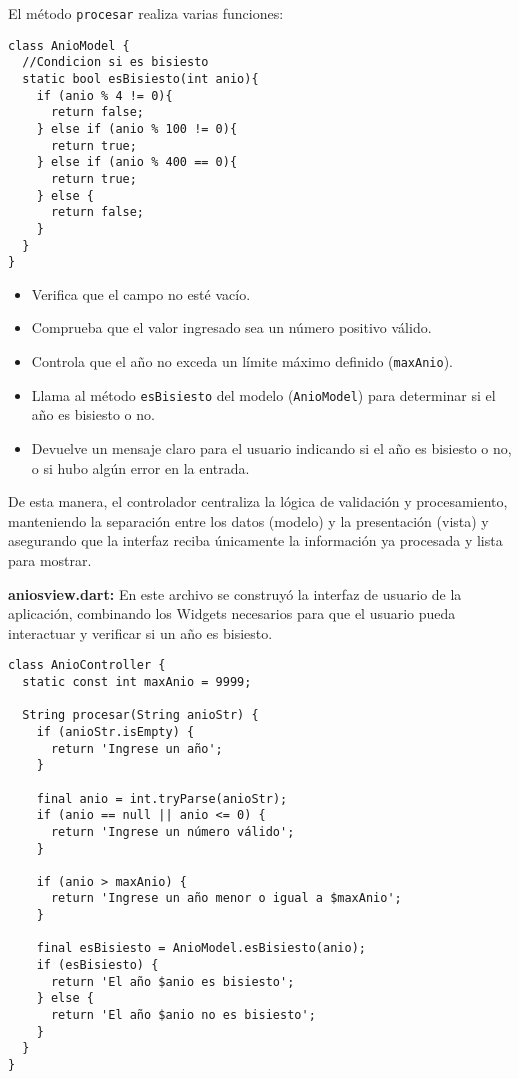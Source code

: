 El método \texttt{procesar} realiza varias funciones:  

\begin{center}
\begin{lstlisting}
class AnioModel {
  //Condicion si es bisiesto
  static bool esBisiesto(int anio){
    if (anio % 4 != 0){
      return false;
    } else if (anio % 100 != 0){
      return true;
    } else if (anio % 400 == 0){
      return true;
    } else {
      return false;
    }
  }
}
\end{lstlisting}
\end{center}

\begin{itemize}
    \item Verifica que el campo no esté vacío.
    \item Comprueba que el valor ingresado sea un número positivo válido.
    \item Controla que el año no exceda un límite máximo definido (\texttt{maxAnio}).
    \item Llama al método \texttt{esBisiesto} del modelo (\texttt{AnioModel}) para determinar si el año es bisiesto o no.
    \item Devuelve un mensaje claro para el usuario indicando si el año es bisiesto o no, o si hubo algún error en la entrada.
\end{itemize}

De esta manera, el controlador centraliza la lógica de validación y procesamiento, manteniendo la separación entre los datos (modelo) y la presentación (vista) y asegurando que la interfaz reciba únicamente la información ya procesada y lista para mostrar.

\textbf{aniosview.dart:}  
En este archivo se construyó la interfaz de usuario de la aplicación, combinando los Widgets necesarios para que el usuario pueda interactuar y verificar si un año es bisiesto.

\begin{center}
\begin{lstlisting}
class AnioController {
  static const int maxAnio = 9999;

  String procesar(String anioStr) {
    if (anioStr.isEmpty) {
      return 'Ingrese un año';
    }

    final anio = int.tryParse(anioStr);
    if (anio == null || anio <= 0) {
      return 'Ingrese un número válido';
    }

    if (anio > maxAnio) {
      return 'Ingrese un año menor o igual a $maxAnio';
    }

    final esBisiesto = AnioModel.esBisiesto(anio);
    if (esBisiesto) {
      return 'El año $anio es bisiesto';
    } else {
      return 'El año $anio no es bisiesto';
    }
  }
}
\end{lstlisting}
\end{center}


